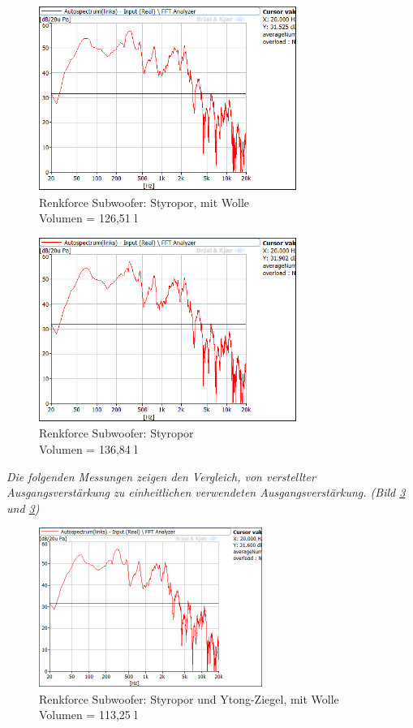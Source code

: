 \begin{figure} [H]
\centering
\includegraphics[width=0.75\textwidth]{img/Optimierung/Sub/RenkforceStyro_126l_Wolle.png}
\caption{Renkforce Subwoofer: Styropor, mit Wolle \\Volumen = 126,51 l}
\label{fig:4.4.2.4}
\end{figure}
\begin{figure} [H]
	\centering
	\includegraphics[width=0.75\textwidth]{img/Optimierung/Sub/RenkforceStyro_136l.png}
	\caption{Renkforce Subwoofer: Styropor \\Volumen = 136,84 l}
	\label{fig:4.4.2.5}
\end{figure}

\newpage
\textit{Die folgenden Messungen zeigen den Vergleich, von verstellter Ausgangsverstärkung zu einheitlichen verwendeten Ausgangsverstärkung. (Bild \ref{fig:4.4.2.6} und \ref{fig:4.4.2.6})}
\begin{figure} [H]
\centering
\includegraphics[width=0.65\textwidth]{img/Optimierung/Sub/RenkforceStyro_113l_Wolle.png}
\caption{Renkforce Subwoofer: Styropor und Ytong-Ziegel, mit Wolle \\Volumen = 113,25 l}
\label{fig:4.4.2.6}
\end{figure}

